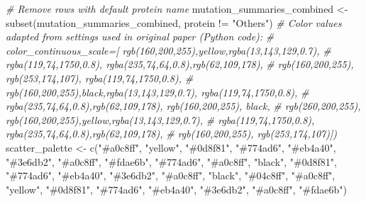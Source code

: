 \documentclass{article}
\newenvironment{Shaded}{\begin{snugshade}}{\end{snugshade}}
\newcommand{\CommentTok}[1]{\textcolor[rgb]{0.56,0.35,0.01}{\textit{#1}}}
\newcommand{\FunctionTok}[1]{\textcolor[rgb]{0.00,0.00,0.00}{#1}}
\newcommand{\NormalTok}[1]{#1}
\newcommand{\OtherTok}[1]{\textcolor[rgb]{0.56,0.35,0.01}{#1}}
\newcommand{\SpecialCharTok}[1]{\textcolor[rgb]{0.00,0.00,0.00}{#1}}
\newcommand{\StringTok}[1]{\textcolor[rgb]{0.31,0.60,0.02}{#1}}
\begin{document}
\begin{Shaded}
\begin{Highlighting}[]
\CommentTok{\# Remove rows with default protein name}
\NormalTok{mutation\_summaries\_combined }\OtherTok{\textless{}{-}} \FunctionTok{subset}\NormalTok{(mutation\_summaries\_combined, protein }\SpecialCharTok{!=} \StringTok{"Others"}\NormalTok{)}
\CommentTok{\# Color values adapted from settings used in original paper (Python code):}
\CommentTok{\# color\_continuous\_scale=[ \textquotesingle{}rgb(160,200,255)\textquotesingle{},\textquotesingle{}yellow\textquotesingle{},\textquotesingle{}rgba(13,143,129,0.7)\textquotesingle{},}
\CommentTok{\# \textquotesingle{}rgba(119,74,1750,0.8)\textquotesingle{}, \textquotesingle{}rgba(235,74,64,0.8)\textquotesingle{},\textquotesingle{}rgb(62,109,178)\textquotesingle{},}
\CommentTok{\# \textquotesingle{}rgb(160,200,255)\textquotesingle{}, \textquotesingle{}rgb(253,174,107)\textquotesingle{}, \textquotesingle{}rgba(119,74,1750,0.8)\textquotesingle{},}
\CommentTok{\# \textquotesingle{}rgb(160,200,255)\textquotesingle{},\textquotesingle{}black\textquotesingle{},\textquotesingle{}rgba(13,143,129,0.7)\textquotesingle{}, \textquotesingle{}rgba(119,74,1750,0.8)\textquotesingle{},}
\CommentTok{\# \textquotesingle{}rgba(235,74,64,0.8)\textquotesingle{},\textquotesingle{}rgb(62,109,178)\textquotesingle{}, \textquotesingle{}rgb(160,200,255)\textquotesingle{}, \textquotesingle{}black\textquotesingle{},}
\CommentTok{\# \textquotesingle{}rgb(260,200,255)\textquotesingle{}, \textquotesingle{}rgb(160,200,255)\textquotesingle{},\textquotesingle{}yellow\textquotesingle{},\textquotesingle{}rgba(13,143,129,0.7)\textquotesingle{},}
\CommentTok{\# \textquotesingle{}rgba(119,74,1750,0.8)\textquotesingle{}, \textquotesingle{}rgba(235,74,64,0.8)\textquotesingle{},\textquotesingle{}rgb(62,109,178)\textquotesingle{},}
\CommentTok{\# \textquotesingle{}rgb(160,200,255)\textquotesingle{}, \textquotesingle{}rgb(253,174,107)\textquotesingle{}])}
\NormalTok{scatter\_palette }\OtherTok{\textless{}{-}} \FunctionTok{c}\NormalTok{(}\StringTok{"\#a0c8ff"}\NormalTok{, }\StringTok{"yellow"}\NormalTok{, }\StringTok{"\#0d8f81"}\NormalTok{, }\StringTok{"\#774ad6"}\NormalTok{, }\StringTok{"\#eb4a40"}\NormalTok{, }\StringTok{"\#3e6db2"}\NormalTok{,}
    \StringTok{"\#a0c8ff"}\NormalTok{, }\StringTok{"\#fdae6b"}\NormalTok{, }\StringTok{"\#774ad6"}\NormalTok{, }\StringTok{"\#a0c8ff"}\NormalTok{, }\StringTok{"black"}\NormalTok{, }\StringTok{"\#0d8f81"}\NormalTok{, }\StringTok{"\#774ad6"}\NormalTok{, }\StringTok{"\#eb4a40"}\NormalTok{,}
    \StringTok{"\#3e6db2"}\NormalTok{, }\StringTok{"\#a0c8ff"}\NormalTok{, }\StringTok{"black"}\NormalTok{, }\StringTok{"\#04c8ff"}\NormalTok{, }\StringTok{"\#a0c8ff"}\NormalTok{, }\StringTok{"yellow"}\NormalTok{, }\StringTok{"\#0d8f81"}\NormalTok{, }\StringTok{"\#774ad6"}\NormalTok{,}
    \StringTok{"\#eb4a40"}\NormalTok{, }\StringTok{"\#3e6db2"}\NormalTok{, }\StringTok{"\#a0c8ff"}\NormalTok{, }\StringTok{"\#fdae6b"}\NormalTok{)}


\end{Highlighting}
\end{Shaded}
\end{document}

